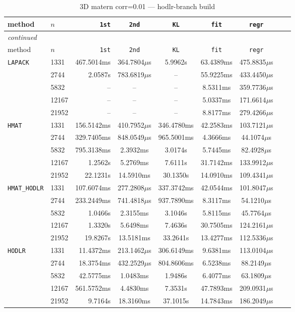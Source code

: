 \documentclass[11pt,a4paper]{article}
\begin{document}
\begin{center}
\begin{longtable}{llrcccccc}
\caption{3D matern corr=0.01 --- hodlr-branch build}
\\\toprule
method & $n$ & \texttt{1st} & \texttt{2nd} & \texttt{KL} & \texttt{fit} & \texttt{regr}\\
\midrule
\endfirsthead
\multicolumn{8}{l}{\small\emph{continued}}\\
\toprule
method & $n$ & \texttt{1st} & \texttt{2nd} & \texttt{KL} & \texttt{fit} & \texttt{regr}\\
\midrule
\endhead

\texttt{LAPACK} & 1331 & 467.5014ms & 364.7804$\mu$s & 5.9962s & 63.4389ms & 475.8835$\mu$s\\
 & 2744 & 2.0587s & 783.6819$\mu$s & -- & 55.9225ms & 433.4450$\mu$s\\
 & 5832 & -- & -- & -- & 8.5311ms & 359.7736$\mu$s\\
 & 12167 & -- & -- & -- & 5.0337ms & 171.6614$\mu$s\\
 & 21952 & -- & -- & -- & 8.8177ms & 279.4266$\mu$s\\
\texttt{HMAT} & 1331 & 156.5142ms & 410.7952$\mu$s & 346.4780ms & 42.2583ms & 103.7121$\mu$s\\
 & 2744 & 329.7405ms & 848.0549$\mu$s & 965.5001ms & 4.3666ms & 44.1074$\mu$s\\
 & 5832 & 795.3138ms & 2.3932ms & 3.0174s & 5.7445ms & 82.4928$\mu$s\\
 & 12167 & 1.2562s & 5.2769ms & 7.6111s & 31.7142ms & 133.9912$\mu$s\\
 & 21952 & 22.1231s & 14.5910ms & 30.1350s & 14.0910ms & 109.4341$\mu$s\\
\texttt{HMAT\_HODLR} & 1331 & 107.6074ms & 277.2808$\mu$s & 337.3742ms & 42.0544ms & 101.8047$\mu$s\\
 & 2744 & 233.2449ms & 741.4818$\mu$s & 937.7890ms & 8.3117ms & 54.1210$\mu$s\\
 & 5832 & 1.0466s & 2.3155ms & 3.1046s & 5.8115ms & 45.7764$\mu$s\\
 & 12167 & 1.3320s & 5.6498ms & 7.4636s & 30.7505ms & 124.2161$\mu$s\\
 & 21952 & 19.8267s & 13.5181ms & 33.2641s & 13.4277ms & 112.5336$\mu$s\\
\texttt{HODLR} & 1331 & 11.4372ms & 213.1462$\mu$s & 306.6149ms & 9.6381ms & 113.0104$\mu$s\\
 & 2744 & 18.3754ms & 432.2529$\mu$s & 804.8606ms & 6.5238ms & 88.2149$\mu$s\\
 & 5832 & 42.5775ms & 1.0483ms & 1.9486s & 6.4077ms & 63.1809$\mu$s\\
 & 12167 & 561.5752ms & 4.4830ms & 7.3531s & 47.7893ms & 209.0931$\mu$s\\
 & 21952 & 9.7164s & 18.3160ms & 37.1015s & 14.7843ms & 186.2049$\mu$s\\
\bottomrule\end{longtable}\end{center}
\end{document}
